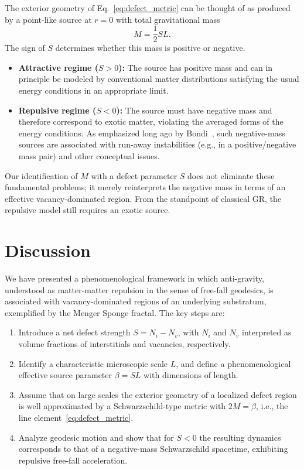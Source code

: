 \documentclass[%
  reprint,
  superscriptaddress,
  showpacs,
  showkeys,
  amsmath,amssymb,
  pra,
  longbibliography,
  floatfix,
  x11names
]{revtex4-2}
\begin{document}
The exterior geometry of Eq.~\eqref{eq:defect_metric} can be thought of as produced by a point-like source at \(r=0\) with total gravitational mass
\begin{equation}
M = \frac{1}{2} SL.
\end{equation}
The sign of \(S\) determines whether this mass is positive or negative.

\begin{itemize}
\item \textbf{Attractive regime (\(S>0\)):} The source has positive mass and can in principle be modeled by conventional matter distributions satisfying the usual energy conditions in an appropriate limit.
\item \textbf{Repulsive regime (\(S<0\)):} The source must have negative mass and therefore correspond to exotic matter, violating the averaged forms of the energy conditions. As emphasized long ago by Bondi~\cite{bondi-1957}, such negative-mass sources are associated with run-away instabilities (e.g., in a positive/negative mass pair) and other conceptual issues.
\end{itemize}

Our identification of \(M\) with a defect parameter \(S\) does not eliminate these fundamental problems; it merely reinterprets the negative mass in terms of an effective vacancy-dominated region. From the standpoint of classical GR, the repulsive model still requires an exotic source.

\section{Discussion}
\label{sec:discuss}

We have presented a phenomenological framework in which anti-gravity, understood as matter-matter repulsion in the sense of free-fall geodesics, is associated with vacancy-dominated regions of an underlying substratum, exemplified by the Menger Sponge fractal. The key steps are:

\begin{enumerate}
\item Introduce a net defect strength \(S = N_i - N_v\), with \(N_i\) and \(N_v\) interpreted as volume fractions of interstitials and vacancies, respectively.
\item Identify a characteristic microscopic scale \(L\), and define a phenomenological effective source parameter \(\beta = SL\) with dimensions of length.
\item Assume that on large scales the exterior geometry of a localized defect region is well approximated by a Schwarzschild-type metric with \(2M = \beta\), i.e., the line element~\eqref{eq:defect_metric}.
\item Analyze geodesic motion and show that for \(S<0\) the resulting dynamics corresponds to that of a negative-mass Schwarzschild spacetime, exhibiting repulsive free-fall acceleration.
\end{enumerate}
\end{document}
